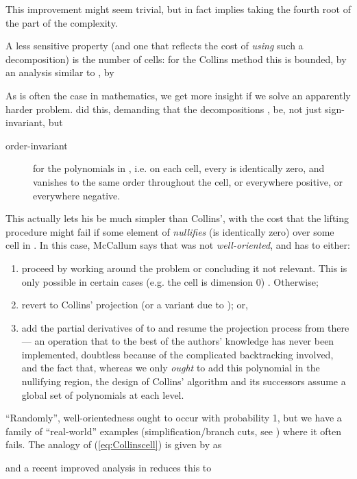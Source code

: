 \documentclass[runningheads,a4paper]{llncs}
\begin{document}
This improvement might seem trivial, but in fact implies taking the fourth root of the  part of the complexity. 
\par
A less sensitive property (and one that reflects the cost of \emph{using} such a decomposition) is the number of cells: for the Collins method this is bounded, by an analysis similar to \cite{Bradfordetal2014a}, by

As is often the case in mathematics, we get more insight if we solve an apparently harder problem. \cite{McCallum1984} did this, demanding that the decompositions ,  be, not just sign-invariant, but 
\begin{description}
\item[order-invariant] for the polynomials in , i.e. on each cell, every  is identically zero, and vanishes to the same order throughout the cell, or everywhere positive, or everywhere negative.
\end{description}
This actually lets his  be much simpler than Collins', with the cost that the lifting procedure might fail if some element  of  \emph{nullifies} (is identically zero) over some cell in .  In this case, McCallum says that  was not \emph{well-oriented}, and has to either:
\begin{enumerate}
\item proceed by working around the problem or concluding it not relevant.  This is only possible in certain cases (e.g. the cell is dimension 0) \cite{Brown2005}.  Otherwise;
\item revert to Collins' projection (or a variant due to \cite{Hong1990b}); or,
\item add the partial derivatives of  to  and resume the projection process from there --- an operation that to the best of the authors' knowledge has never been implemented, doubtless because of the complicated backtracking involved, and the fact that, whereas we only \emph{ought} to add this polynomial in the nullifying region, the design of Collins' algorithm and its successors assume a global set of polynomials at each level.
\end{enumerate}
``Randomly'', well-orientedness ought to occur with probability 1,
but we have a family of ``real-world'' examples (simplification/branch cuts, see \cite{Beaumontetal2007}) where it often fails.
The analogy of (\ref{eq:Collinscell}) is given by \cite[Theorem 6.1.5]{McCallum1985b} as 

and a recent improved analysis in \cite[(12)]{Bradfordetal2014a} reduces this to
\end{document}
